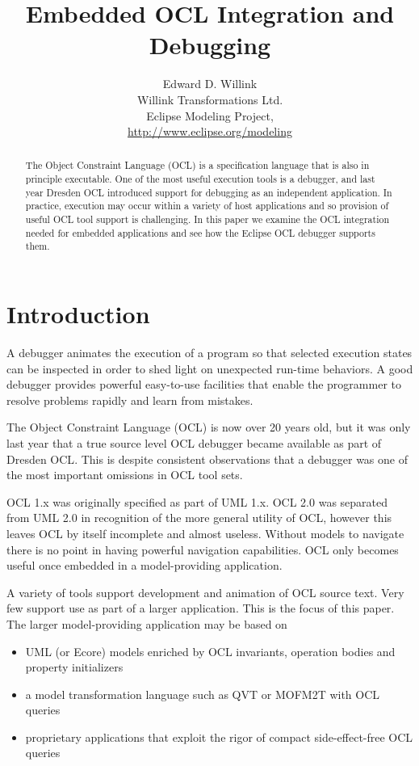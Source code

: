 \documentclass[a4paper]{article}
\title{Embedded OCL Integration and Debugging}
\author{
Edward D. Willink \\ Willink Transformations Ltd.\\
                Eclipse Modeling Project, \\ \url{http://www.eclipse.org/modeling}
}
\begin{document}
\maketitle

\begin{abstract}
The Object Constraint Language (OCL) is a specification language that is also in principle executable. One of the most useful execution tools is a debugger, and last year Dresden OCL introduced support for debugging as an independent application.  In practice, execution may occur within a variety of host applications and so provision of useful OCL tool support is challenging. In this paper we examine the OCL integration needed for embedded applications and see how the Eclipse OCL debugger supports them.  
\end{abstract}
\vskip 32pt

\section{Introduction}
A debugger animates the execution of a program so that selected execution states can be inspected in order to shed light on unexpected run-time behaviors. A good debugger provides powerful easy-to-use facilities that enable the programmer to resolve problems rapidly and learn from mistakes.

The Object Constraint Language (OCL)\cite{OCL-2.4} is now over 20 years old, but it was only last year that a true source level OCL debugger became available as part of Dresden OCL\cite{DresdenOCL-Debug}. This is despite consistent observations that a debugger was one of the most important omissions in OCL tool sets\cite{Chimiak-Opaka}.

OCL 1.x was originally specified as part of UML 1.x. OCL 2.0 was separated from UML 2.0 in recognition of the more general utility of OCL, however this leaves OCL by itself incomplete and almost useless. Without models to navigate there is no point in having powerful navigation capabilities. OCL only becomes useful once embedded in a model-providing application.

A variety of tools support development and animation of OCL source text. Very few support use as part of a larger application. This is the focus of this paper. The larger model-providing application may be based on 

\begin{itemize}
\item UML\cite{UML-2.5} (or Ecore\cite{EMF}) models enriched by OCL invariants, operation bodies and property initializers
\item a model transformation language such as QVT\cite{QVT-1.2} or MOFM2T\cite{MOFM2T} with OCL queries
\item proprietary applications that exploit the rigor of compact side-effect-free OCL queries
\end{itemize}
\end{document}
